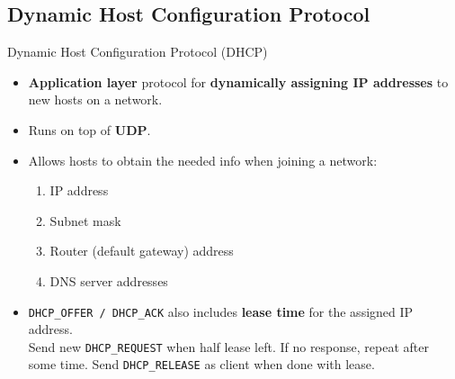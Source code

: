 
\subsection{Dynamic Host Configuration Protocol}

\begin{definition}
    {Dynamic Host Configuration Protocol (DHCP)}
    \begin{itemize}
        \item \textbf{Application layer} protocol for \textbf{dynamically assigning IP addresses} to new hosts on a network.
        \item Runs on top of \textbf{UDP}.
        \item Allows hosts to obtain the needed info when joining a network:
              \begin{enumerate}
                  \item IP address
                  \item Subnet mask
                  \item Router (default gateway) address
                  \item DNS server addresses
              \end{enumerate}
        \item \texttt{DHCP\_OFFER / DHCP\_ACK} also includes \textbf{lease time} for the assigned IP address.\\
              Send new \texttt{DHCP\_REQUEST} when half lease left. If no response, repeat after some time. Send \texttt{DHCP\_RELEASE} as client when done with lease.
    \end{itemize}
\end{definition}

